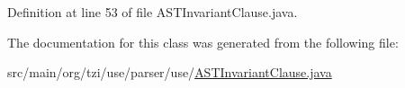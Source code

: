 Definition at line 53 of file A\-S\-T\-Invariant\-Clause.\-java.



The documentation for this class was generated from the following file\-:\begin{DoxyCompactItemize}
\item 
src/main/org/tzi/use/parser/use/\hyperlink{_a_s_t_invariant_clause_8java}{A\-S\-T\-Invariant\-Clause.\-java}\end{DoxyCompactItemize}
